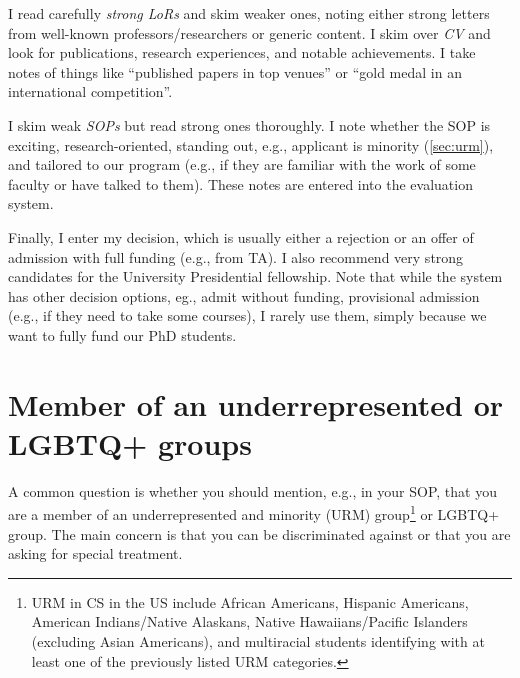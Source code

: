 \documentclass[oneside,11pt,dvipsnames]{book}
\def\sectioninfo#1{%
  \addcontentsline{toc}{sectioninfo}{%
    \noexpand\numberline{}\color{black}{#1}}%
}
\begin{document}
I read carefully \emph{strong LoRs} and skim weaker ones, noting either strong letters from well-known professors/researchers or generic content. I skim over \emph{CV} and look for publications, research experiences, and notable achievements. I take notes of things like ``published papers in top venues'' or ``gold medal in an international competition''.

I skim weak \emph{SOPs} but read strong ones thoroughly. I note whether the SOP is exciting, research-oriented, standing out, e.g., applicant is minority (\autoref{sec:urm}), and tailored to our program (e.g., if they are familiar with the work of some faculty or have talked to them). These notes are entered into the evaluation system.

Finally, I enter my decision, which is usually either a rejection or an offer of admission with full funding (e.g., from TA). I also recommend very strong candidates for the University Presidential fellowship. Note that while the system has other decision options, eg., admit without funding, provisional admission (e.g., if they need to take some courses), I rarely use them, simply because we want to fully fund our PhD students. 

\section{Member of an underrepresented or LGBTQ+ groups}\label{sec:urm}
\sectioninfo{Being a minority can make you stand out and help your application.}

A common question is whether you should mention, e.g., in your SOP, that you are a member of an underrepresented and minority (URM) group\footnote{URM in CS in the US include African Americans, Hispanic Americans, American Indians/Native Alaskans, Native Hawaiians/Pacific Islanders (excluding Asian Americans), and multiracial students identifying with at least one of the previously listed URM categories.} or LGBTQ+ group.
The main concern is that you can be discriminated against or that you are asking for special treatment.

\end{document}

